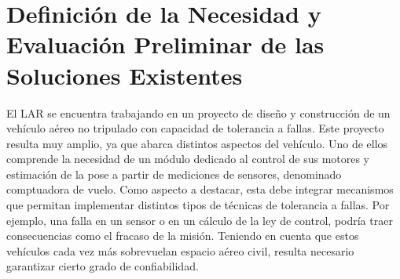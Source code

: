 \section{Definición de la Necesidad y Evaluación Preliminar de las Soluciones Existentes}



El LAR se encuentra trabajando en un proyecto de diseño y construcción de un vehículo aéreo no tripulado con capacidad de tolerancia a fallas. Este proyecto resulta muy amplio, ya que abarca distintos aspectos del vehículo. Uno de ellos comprende la necesidad de un módulo dedicado al control de sus motores y estimación de la pose a partir de mediciones de sensores, denominado comptuadora de vuelo. Como aspecto a destacar, esta debe integrar mecanismos que permitan implementar distintos tipos de técnicas de tolerancia a fallas. Por ejemplo, una falla en un sensor o en un cálculo de la ley de control, podría traer consecuencias como el fracaso de la misión. Teniendo en cuenta que estos vehículos cada vez más sobrevuelan espacio aéreo civil, resulta necesario garantizar cierto grado de confiabilidad.\\

